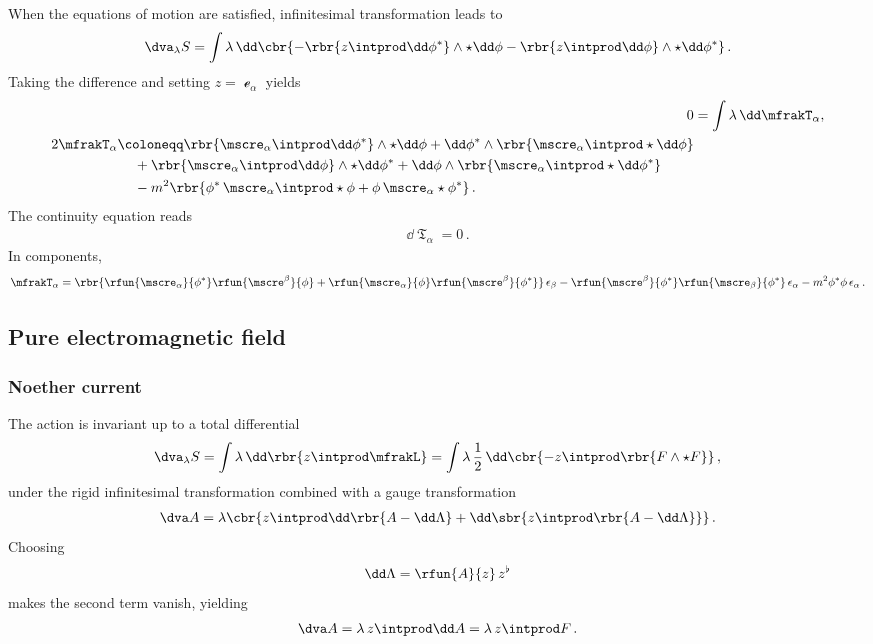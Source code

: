 \documentclass[a4paper]{article}
\begin{document}
When the equations of motion are satisfied, infinitesimal 
transformation leads to
\begin{align}
\dva_{\lambda} S = \int \lambda\,\dd\cbr{
	-\rbr{z\intprod\dd\phi^*}\wedge\star\dd\phi
	-\rbr{z\intprod\dd\phi}\wedge\star\dd\phi^*}\,.
\end{align}
Taking the difference and setting $z = \mscre_{\alpha}$ yields
\begin{align}
0 &= \int \lambda\,\dd \mfrakT_{\alpha}, \\
\begin{split}
2 \mfrakT_{\alpha} &\coloneqq
\rbr{\mscre_{\alpha}\intprod\dd\phi^*}\wedge\star\dd\phi +
\dd\phi^*\wedge\rbr{\mscre_{\alpha}\intprod\star\dd\phi}
\\
&\quad\,+
\rbr{\mscre_{\alpha}\intprod\dd\phi}\wedge\star\dd\phi^* +
\dd\phi\wedge\rbr{\mscre_{\alpha}\intprod\star\dd\phi^*}
\\
&\quad\,-
m^2\rbr{\phi^*\,\mscre_{\alpha}\intprod\star\phi +
	\phi\,\mscre_{\alpha}\star\phi^*}\,.
\end{split}
\end{align}
The continuity equation reads
\begin{align}
\dd \mfrakT_{\alpha} = 0\,.
\end{align}
In components,
\begin{align}
\mfrakT_{\alpha} =
\rbr{\rfun{\mscre_{\alpha}}{\phi^*} \rfun{\mscre^{\beta}}{\phi}+
	\rfun{\mscre_{\alpha}}{\phi} \rfun{\mscre^{\beta}}{\phi^*}}\,
		\epsilon_{\beta} - 
\rfun{\mscre^{\beta}}{\phi^*} \rfun{\mscre_{\beta}}{\phi^*}\,
	\epsilon_{\alpha}
- m^2 \phi^* \phi\, \epsilon_{\alpha}\,.
\end{align}

\subsection{Pure electromagnetic field}

\subsubsection{Noether current}
The action is invariant up to a total differential
\begin{align}
\dva_{\lambda} S = \int \lambda\,\dd\rbr{z \intprod \mfrakL}
= \int \lambda\,\frac{1}{2}\,\dd\cbr{
	- z\intprod \rbr{F\wedge\star F} }\,,
\end{align}
under the rigid infinitesimal transformation combined with a gauge 
transformation
\begin{align}
\dva A = \lambda\cbr{z\intprod \dd \rbr{A-\dd\Lambda} + 
	\dd\sbr{z\intprod\rbr{A-\dd\Lambda}}}\,.
\end{align}
Choosing
\begin{align}
\dd\Lambda = \rfun{A}{z}\,z^{\flat}
\end{align}
makes the second term vanish, yielding
\begin{align}
\dva A = \lambda\,z\intprod \dd A = \lambda\,z\intprod F \,.
\end{align}
\end{document}
